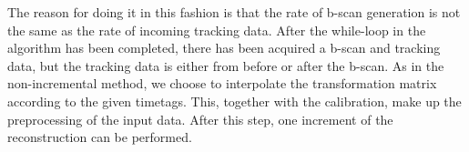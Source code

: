 The reason for doing it in this fashion is that the rate of b-scan generation is not the same as the rate of incoming tracking data. After the while-loop in the algorithm has been completed, there has been acquired a b-scan and tracking data, but the tracking data is either from before or after the b-scan. As in the non-incremental method, we choose to interpolate the transformation matrix according to the given timetags. This, together with the calibration, make up the preprocessing of the input data. After this step, one increment of the reconstruction can be performed.